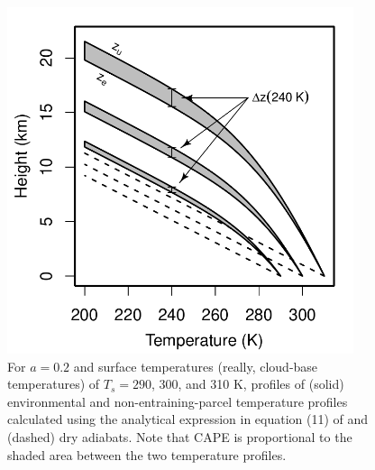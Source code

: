 \documentclass[12pt]{article}
\begin{document}
\begin{figure}
\begin{center}
\includegraphics[width=4in]{../figures/17leshouches_profiles.pdf}
\caption{For $a=0.2$ and surface temperatures (really, cloud-base temperatures) of $T_s = 290$, 300, and 310 K, profiles of (solid) environmental and non-entraining-parcel temperature profiles calculated using the analytical expression in equation (11) of \citet{15cape} and (dashed) dry adiabats.  Note that CAPE is proportional to the shaded area between the two temperature profiles.}
\label{17leshouches_profiles}
\end{center}
\end{figure}
\end{document}
